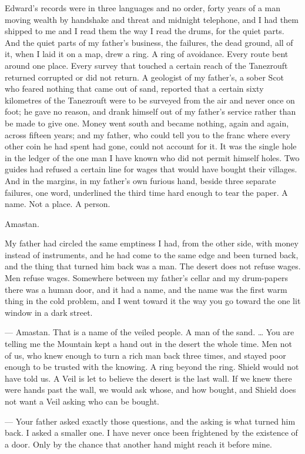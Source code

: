 Edward's records were in three languages and no order, forty years of a man moving wealth by handshake and threat and midnight telephone, and I had them shipped to me and I read them the way I read the drums, for the quiet parts. And the quiet parts of my father's business, the failures, the dead ground, all of it, when I laid it on a map, drew a ring. A ring of avoidance. Every route bent around one place. Every survey that touched a certain reach of the Tanezrouft returned corrupted or did not return. A geologist of my father's, a sober Scot who feared nothing that came out of sand, reported that a certain sixty kilometres of the Tanezrouft were to be surveyed from the air and never once on foot; he gave no reason, and drank himself out of my father's service rather than be made to give one. Money went south and became nothing, again and again, across fifteen years; and my father, who could tell you to the franc where every other coin he had spent had gone, could not account for it. It was the single hole in the ledger of the one man I have known who did not permit himself holes. Two guides had refused a certain line for wages that would have bought their villages. And in the margins, in my father's own furious hand, beside three separate failures, one word, underlined the third time hard enough to tear the paper. A name. Not a place. A person.\par

Amastan.\par

My father had circled the same emptiness I had, from the other side, with money instead of instruments, and he had come to the same edge and been turned back, and the thing that turned him back was a man. The desert does not refuse wages. Men refuse wages. Somewhere between my father's cellar and my drum-papers there was a human door, and it had a name, and the name was the first warm thing in the cold problem, and I went toward it the way you go toward the one lit window in a dark street.\par

\begin{room}

--- Amastan. That is a name of the veiled people. A man of the sand. \ldots{} You are telling me the Mountain kept a hand out in the desert the whole time. Men not of us, who knew enough to turn a rich man back three times, and stayed poor enough to be trusted with the knowing. A ring beyond the ring. Shield would not have told us. A Veil is let to believe the desert is the last wall. If we knew there were hands past the wall, we would ask whose, and how bought, and Shield does not want a Veil asking who can be bought.

--- Your father asked exactly those questions, and the asking is what turned him back. I asked a smaller one. I have never once been frightened by the existence of a door. Only by the chance that another hand might reach it before mine.

\end{room}

